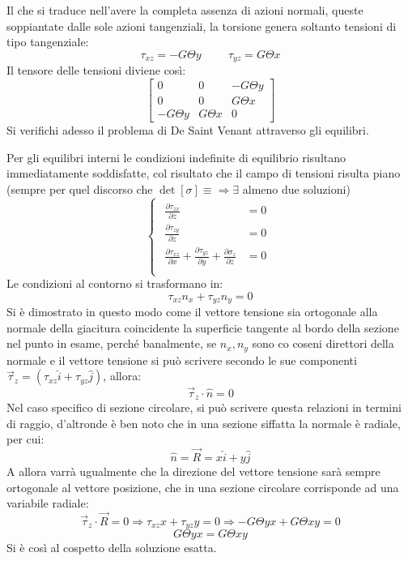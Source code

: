\documentclass{article}
\begin{document}
\begin{adjustwidth}{2in}{}
		Il che si traduce nell'avere la completa assenza di azioni normali, queste soppiantate dalle sole azioni tangenziali, la torsione genera soltanto tensioni di tipo tangenziale: 
		\[ \tau_{xz} = -G\Theta y \hspace{1cm} \tau_{yz} = G\Theta x\]
		Il tensore delle tensioni diviene così: 
	 	\[ \left[ \begin{array}{ccc}
		0 & 0 & -G\Theta y \\
		0 & 0 & G\Theta x \\
		-G\Theta y & G\Theta x & 0
		\end{array}\right] \]
		Si verifichi adesso il problema di De Saint Venant attraverso gli equilibri. 
		
		Per gli equilibri interni le condizioni indefinite di equilibrio risultano immediatamente soddisfatte, col risultato che il campo di tensioni risulta piano (sempre per quel discorso che $\det[\sigma]\equiv\Rightarrow\exists$ almeno due soluzioni) 
		\[
		\begin{cases}
			\begin{aligned}
				\frac{\partial \tau_{zx}}{\partial z} & =0 \\
				
				\frac{\partial \tau_{zy}}{\partial z} & =0 \\
				
				\frac{\partial \tau_{xz}}{\partial x} + \frac{\partial \tau_{yz}}{\partial y} + \frac{\partial\sigma_z}{\partial z} & =0 \\
			\end{aligned}
		\end{cases}
		\]
		Le condizioni al contorno si trasformano in:
		\[ \tau_{xz}n_x + \tau_{yz}n_y = 0\]
		Si è dimostrato in questo modo come il vettore tensione sia ortogonale alla normale
		della giacitura coincidente la superficie tangente al
		bordo della sezione nel punto in esame, perché banalmente, se $n_x, n_y$ sono co coseni direttori della normale e il vettore tensione si può scrivere secondo le sue componenti $\vec{\tau}_z = (\tau_{xz}\hat{i} +  \tau_{yz}\hat{j})$, allora:
		\[\vec{\tau}_z \cdot \hat{n} = 0\]
		Nel caso specifico di sezione circolare, si può scrivere questa relazioni in termini di raggio, d'altronde è ben noto che in una sezione siffatta la normale è radiale, per cui: 
		\[\hat{n} = \vec{R} = x\hat{i} + y\hat{j}\]
		A allora varrà ugualmente che la direzione del vettore tensione sarà sempre ortogonale al vettore posizione, che in una sezione circolare corrisponde ad una variabile radiale:
		\[\vec{\tau}_z \cdot \vec{R} = 0 \Rightarrow \tau_{xz}x +  \tau_{yz}y = 0 \Rightarrow -G\Theta yx + G\Theta xy =0 \]
		\[ G\Theta yx = G\Theta xy \]
		Si è così al cospetto della soluzione esatta. 
		

\end{adjustwidth}
\end{document}
